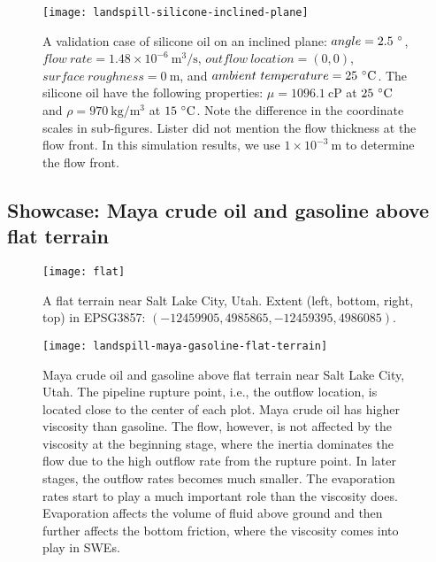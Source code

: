 \begin{figure*}
    \centering
    \texttt{[image: landspill-silicone-inclined-plane]}
    \caption{%
        A validation case of silicone oil on an inclined plane: $angle=2.5\ \mathrm{\degree}$, $flow\ rate=1.48\times 10^{-6}\ \mathrm{m^3/s}$, $outflow\ location=(0, 0)$, $surface\ roughness=0\ \mathrm{m}$, and $ambient\ temperature=25\ \mathrm{\degree C}$. %
        The silicone oil have the following properties: $\mu=1096.1\ \mathrm{cP}$ at $25\ \mathrm{\degree C}$ and $\rho=970\ \mathrm{kg/m^3}$ at $15\ \mathrm{\degree C}$. %
        Note the difference in the coordinate scales in sub-figures. %
        Lister did not mention the flow thickness at the flow front. %
        In this simulation results, we use $1\times 10^{-3}\ \mathrm{m}$ to determine the flow front.%
    }\label{fig:landspill-silicone-inclined}
\end{figure*}

\subsection{Showcase: Maya crude oil and gasoline above flat terrain}

\begin{figure}
    \centering
    \texttt{[image: flat]}
    \caption{%
        A flat terrain near Salt Lake City, Utah. %
        Extent (left, bottom, right, top) in EPSG3857: $(-12459905, 4985865, -12459395, 4986085)$.
    }\label{fig:flat-terrain-satellite}
\end{figure}

\begin{figure*}
    \texttt{[image: landspill-maya-gasoline-flat-terrain]}
    \caption{%
        Maya crude oil and gasoline above flat terrain near Salt Lake City, Utah. %
        The pipeline rupture point, i.e., the outflow location, is located close to the center of each plot. %
        Maya crude oil has higher viscosity than gasoline. %
        The flow, however, is not affected by the viscosity at the beginning stage, where the inertia dominates the flow due to the high outflow rate from the rupture point. %
        In later stages, the outflow rates becomes much smaller. %
        The evaporation rates start to play a much important role than the viscosity does. %
        Evaporation affects the volume of fluid above ground and then further affects the bottom friction, where the viscosity comes into play in SWEs.%
    }\label{fig:landspill-maya-gasoline-flat}
\end{figure*}

